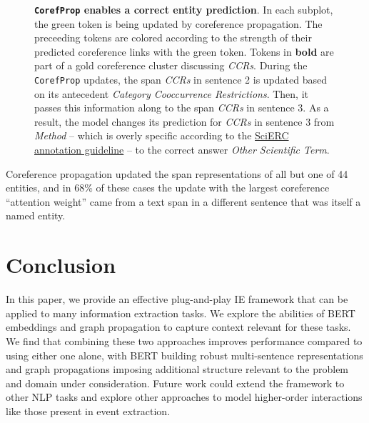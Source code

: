 \documentclass[11pt,a4paper]{article}
\begin{document}
\begin{figure}[t]
  \centering



  \caption{\textbf{\texttt{CorefProp} enables a correct entity prediction}.
    In each subplot, the green token is being updated by coreference propagation. The preceeding tokens are colored according to the strength of their predicted coreference links with the green token. Tokens in \textbf{bold} are part of a gold coreference cluster discussing \emph{CCRs}. During the \texttt{CorefProp} updates, the span \emph{CCRs} in sentence 2 is updated based on its antecedent \emph{Category Cooccurrence Restrictions}. Then, it passes this information along to the span \emph{CCRs} in sentence 3. As a result, the model changes its prediction for \emph{CCRs} in sentence 3 from \emph{Method} -- which is overly specific according to the \href{http://nlp.cs.washington.edu/sciIE/annotation_guideline.pdf}{SciERC annotation guideline} -- to the correct answer \emph{Other Scientific Term}.
  }

  \label{fig:coref_prop_scierc}
  \vspace{-1em}
\end{figure}
 
Coreference propagation updated the span representations of all but one of 44 entities, and in 68\% of these cases the update with the largest coreference ``attention weight'' came from a text span in a different sentence that was itself a named entity.
 \vspace{-.1cm}
\section{Conclusion}
\vspace{-.1cm}
In this paper, we provide an effective plug-and-play IE framework that can be applied to many information extraction tasks. We explore the abilities of BERT embeddings and graph propagation to capture context relevant for these tasks. We find that combining these two approaches improves performance compared to using either one alone, with BERT building robust multi-sentence representations and graph propagations imposing additional structure relevant to the problem and domain under consideration. Future work could extend the framework to other NLP tasks and explore other approaches to model higher-order interactions like those present in event extraction.
\end{document}
